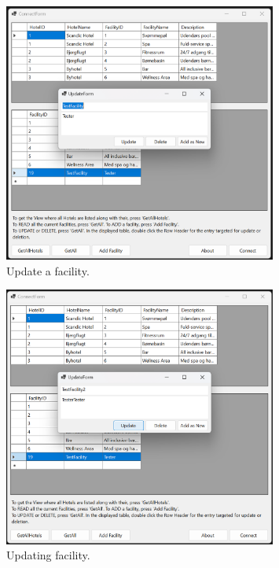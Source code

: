 \begin{figure}
    \centering
    \includegraphics[width=0.8\textwidth]{figures/app-screenshots/7facilityupdate.png}
    \caption{Update a facility.}
    \label{fig:7facilityupdate}
\end{figure}

\begin{figure}
    \centering
    \includegraphics[width=0.8\textwidth]{figures/app-screenshots/8facilitytobeupdated.png}
    \caption{Updating facility.}
    \label{fig:8facilitytobeupdated}
\end{figure}

